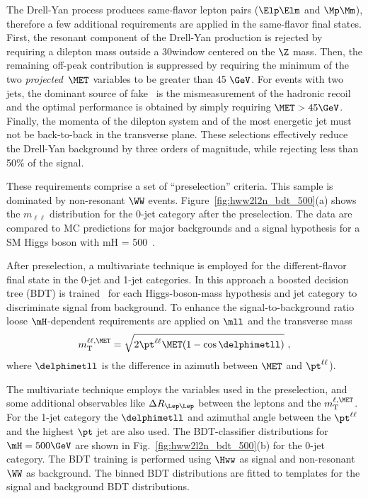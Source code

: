 The Drell-Yan process produces same-flavor lepton pairs ($\Elp\Elm$
and $\Mp\Mm$), therefore a few additional requirements are applied in the
same-flavor final states.  First, the resonant component of the
Drell-Yan production is rejected by requiring a dilepton mass outside
a 30\GeV window centered on the $\Z$ mass.  Then, the remaining
off-peak contribution is suppressed by requiring the minimum of
the two \textit{projected}~$\MET$ variables to be greater than 45
$\GeV$. For events with two jets, the dominant source of fake
\MET\ is the mismeasurement of the hadronic recoil and the optimal
performance is obtained by simply requiring $\MET > 45 \GeV$.
 Finally, the momenta of the dilepton system and of the most energetic
jet must not be back-to-back in the transverse plane. These selections
effectively reduce the Drell-Yan background by three orders of
magnitude, while rejecting less than 50\% of the signal.

These requirements comprise a set of ``preselection'' criteria.
This sample
is dominated by non-resonant $\WW$ events.  
Figure~\ref{fig:hww2l2n_bdt_500}(a) shows the $m_{\ell\ell}$
distribution
for the 0-jet category
after the preselection. 
The data are compared to MC predictions for major backgrounds and
a signal hypothesis for a SM Higgs boson with mH = 500~\GeV.

After preselection, a multivariate technique is employed for the
different-flavor final state in the 0-jet and 1-jet
categories. In this approach a boosted decision tree (BDT) is
trained~\cite{tmva} for each Higgs-boson-mass hypothesis and jet
category to discriminate signal from background. 
To enhance the signal-to-background ratio
loose $\mH$-dependent requirements are
applied 
 on $\mll$ and
the transverse mass
\begin{equation} 
m_\mathrm{T}^{\ell\ell,\MET} = \sqrt{2 \pt^{\ell\ell} \MET (1-\cos\delphimetll)}\ ,
\nonumber
\end{equation}
where
$\delphimetll$
is the difference in azimuth between $\MET$ and $\pt^{\ell\ell}$).

The multivariate technique employs the
variables used in the preselection, and some additional observables like
$\Delta R_{\Lep\Lep}$
between the leptons and the $m_\mathrm{T}^{\ell,\MET}$. 
For the 1-jet category the $\delphimetll$ and
azimuthal angle between the
$\pt^{\ell\ell}$ and the
highest $\pt$ jet are also used. The BDT-classifier distributions for $\mH=500\GeV$
are shown in Fig.~\ref{fig:hww2l2n_bdt_500}(b) for the 0-jet
category.  The BDT training is performed using $\Hww$ as signal and
non-resonant $\WW$ as background. The binned BDT distributions are
fitted to templates for the signal and background BDT distributions.

